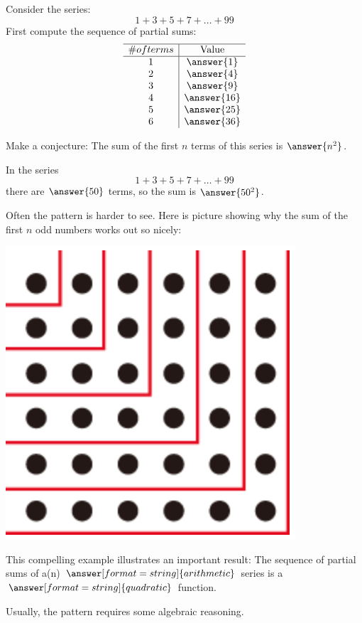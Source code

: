 \documentclass[nooutcomes]{ximera}
\begin{document}
\begin{problem}
Consider the series: 
\[
1+3+5+7+\dots+99
\]
First compute the sequence of partial sums: 
\[
\begin{array}{c|c} \hline
\# of terms & \text{Value} \\ \hline
1 & \answer{1} \\
2 & \answer{4} \\
3 & \answer{9}\\
4 & \answer{16}\\
5 & \answer{25}\\
6 & \answer{36}\\
\end{array}
\]
\begin{problem}
Make a conjecture: The sum of the first $n$ terms of this series is $\answer{n^2}$. 

In the series
\[
1+3+5+7+\dots+99
\]
there are $\answer{50}$ terms, so the sum is $\answer{50^2}$.  

\begin{problem}[correct]
Often the pattern is harder to see.  Here is picture showing why the sum of the first $n$ odd numbers works out so nicely: 
\begin{image}
\includegraphics[scale=0.5]{sumOdds.png}
\end{image}

This compelling example illustrates an important result:  The sequence of partial sums of a(n) $\answer[format=string]{arithmetic}$ series is a $\answer[format=string]{quadratic}$ function.  

Usually, the pattern requires some algebraic reasoning.  
\end{problem}
\end{problem}
\end{problem}
\end{document}
